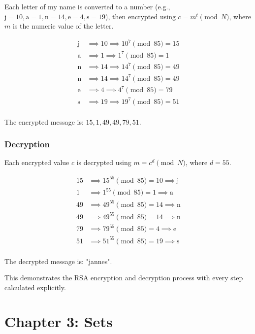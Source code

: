 \documentclass{article}
\begin{document}
Each letter of my name is converted to a number (e.g., \( \text{j} = 10, \text{a} = 1, \text{n} = 14, \text{e} = 4, \text{s} = 19 \)), then encrypted using \( c = m^t \pmod{N} \), where \( m \) is the numeric value of the letter.

\[
\begin{aligned}
\text{j} &\implies 10 \implies 10^7 \pmod{85} = 15 \\
\text{a} &\implies 1 \implies 1^7 \pmod{85} = 1 \\
\text{n} &\implies 14 \implies 14^7 \pmod{85} = 49 \\
\text{n} &\implies 14 \implies 14^7 \pmod{85} = 49 \\
\text{e} &\implies 4 \implies 4^7 \pmod{85} = 79 \\
\text{s} &\implies 19 \implies 19^7 \pmod{85} = 51 \\
\end{aligned}
\]

The encrypted message is: \( 15, 1, 49, 49, 79, 51 \).

\subsubsection*{Decryption}

Each encrypted value \( c \) is decrypted using \( m = c^d \pmod{N} \), where \( d = 55 \).

\[
\begin{aligned}
15 &\implies 15^{55} \pmod{85} = 10 \implies \text{j} \\
1 &\implies 1^{55} \pmod{85} = 1 \implies \text{a} \\
49 &\implies 49^{55} \pmod{85} = 14 \implies \text{n} \\
49 &\implies 49^{55} \pmod{85} = 14 \implies \text{n} \\
79 &\implies 79^{55} \pmod{85} = 4 \implies \text{e} \\
51 &\implies 51^{55} \pmod{85} = 19 \implies \text{s} \\
\end{aligned}
\]

The decrypted message is: "jannes".

This demonstrates the RSA encryption and decryption process with every step calculated explicitly. 

\newpage

\section{Chapter 3: Sets}
\end{document}
